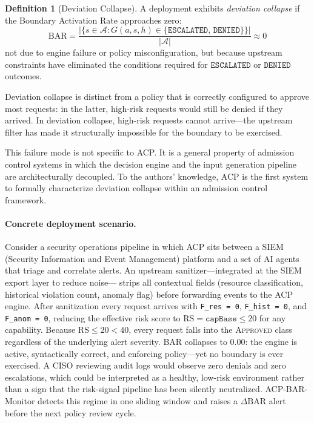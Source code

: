 \documentclass[11pt]{article}
\theoremstyle{definition}
\newtheorem{definition}{Definition}
\begin{document}
\begin{definition}[Deviation Collapse]
A deployment exhibits \emph{deviation collapse} if the Boundary Activation Rate
approaches zero:
\[
\mathrm{BAR} = \frac{|\{s \in \mathcal{A} : G(a, s, h) \in
  \{\texttt{ESCALATED},\,\texttt{DENIED}\}\}|}{|\mathcal{A}|} \approx 0
\]
not due to engine failure or policy misconfiguration, but because upstream
constraints have eliminated the conditions required for
$\texttt{ESCALATED}$ or $\texttt{DENIED}$ outcomes.
\end{definition}

Deviation collapse is distinct from a policy that is correctly configured to
approve most requests: in the latter, high-risk requests would still be denied if
they arrived. In deviation collapse, high-risk requests cannot arrive---the
upstream filter has made it structurally impossible for the boundary to be exercised.

This failure mode is not specific to ACP.
It is a general property of admission control systems in which the decision
engine and the input generation pipeline are architecturally decoupled.
To the authors' knowledge, ACP is the first system to formally characterize deviation collapse within an admission control framework.

\paragraph{Concrete deployment scenario.}
Consider a security operations pipeline in which ACP sits between a SIEM
(Security Information and Event Management) platform and a set of AI agents
that triage and correlate alerts.
An upstream sanitizer---integrated at the SIEM export layer to reduce noise---
strips all contextual fields (resource classification, historical violation count,
anomaly flag) before forwarding events to the ACP engine.
After sanitization every request arrives with \texttt{F\_res = 0}, \texttt{F\_hist = 0},
and \texttt{F\_anom = 0}, reducing the effective risk score to
$\mathrm{RS} = \mathtt{capBase} \leq 20$ for any capability.
Because $\mathrm{RS} \leq 20 < 40$, every request falls into the
\textsc{Approved} class regardless of the underlying alert severity.
BAR collapses to $0.00$: the engine is active, syntactically correct, and
enforcing policy---yet no boundary is ever exercised.
A CISO reviewing audit logs would observe zero denials and zero escalations,
which could be interpreted as a healthy, low-risk environment rather than
a sign that the risk-signal pipeline has been silently neutralized.
ACP-BAR-Monitor detects this regime in one sliding window and raises a
$\Delta\mathrm{BAR}$ alert before the next policy review cycle.
\end{document}
